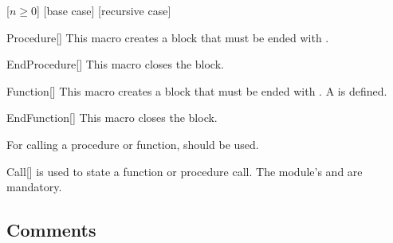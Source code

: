 \documentclass[a4paper, 11pt]{article}
\begin{document}
\begin{tcblisting}{}
    \begin{algorithmic}
        [$n \geq 0$]
                [base case]
            \Else
                [recursive case]
            \EndIf
        \EndFunction
    \end{algorithmic}
\end{tcblisting}

\begin{macro}{Procedure}[]
    This macro creates a  block that must be ended with .

    \BlockOptionsText
\end{macro}

\begin{macro}{EndProcedure}[]
    This macro closes the  block.

    \MacroOptionsText
\end{macro}

\begin{macro}{Function}[]
    This macro creates a  block that must be ended with . A  is defined.

    \BlockOptionsText
\end{macro}

\begin{macro}{EndFunction}[]
    This macro closes the  block.

    \MacroOptionsText
\end{macro}

For calling a procedure or function,  should be used.

\begin{macro}{Call}[]
    \label{call}
     is used to state a function or procedure call. The module's  and  are mandatory.

    \MacroOptionsText
\end{macro}

\subsection{Comments}\label{sec:comments}
\end{document}
